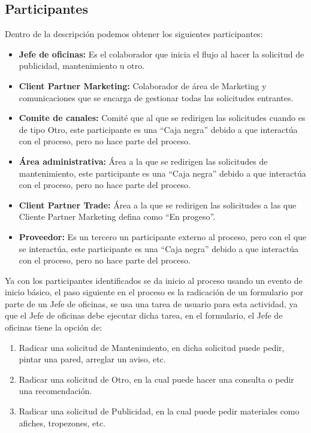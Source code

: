 \subsection{Participantes}
Dentro de la descripción podemos obtener los siguientes participantes: 
\begin{itemize}
	\item \textbf{Jefe de oficinas: }Es el colaborador que inicia el flujo al hacer la solicitud de publicidad, mantenimiento u otro.
	\item \textbf{Client Partner Marketing: } Colaborador de área de Marketing y comunicaciones que se encarga de gestionar todas las solicitudes entrantes.
	\item \textbf{Comite de canales: } Comité que al que se redirigen las solicitudes cuando es de tipo Otro, este participante es una ``Caja negra'' debido a que interactúa con el proceso, pero no hace parte del proceso.
	\item \textbf{Área administrativa: }Área a la que se redirigen las solicitudes de mantenimiento, este participante es una ``Caja negra'' debido a que interactúa con el proceso, pero no hace parte del proceso.
	\item \textbf{Client Partner Trade: }Área a la que se redirigen las solicitudes a las que Cliente Partner Marketing defina como ``En progeso''.
	\item \textbf{Proveedor: }Es un tercero un participante externo al proceso, pero con el que se interactúa, este participante es una ``Caja negra'' debido a que interactúa con el proceso, pero no hace parte del proceso.
\end{itemize}

Ya con los participantes identificados se da inicio al proceso usando un evento de inicio básico, el paso siguiente en el proceso es la radicación de un formulario por parte de un Jefe de oficinas, se usa una tarea de usuario para esta actividad, ya que el Jefe de oficinas debe ejecutar dicha tarea, en el formulario, el Jefe de oficinas tiene la opción de: 
\begin{enumerate}
	\item Radicar una solicitud de Mantenimiento, en dicha solicitud puede pedir, pintar una pared, arreglar un aviso, etc.
	\item Radicar una solicitud de Otro, en la cual puede hacer una consulta o pedir una recomendación.
	\item Radicar una solicitud de Publicidad, en la cual puede pedir materiales como afiches, tropezones, etc.
\end{enumerate}

